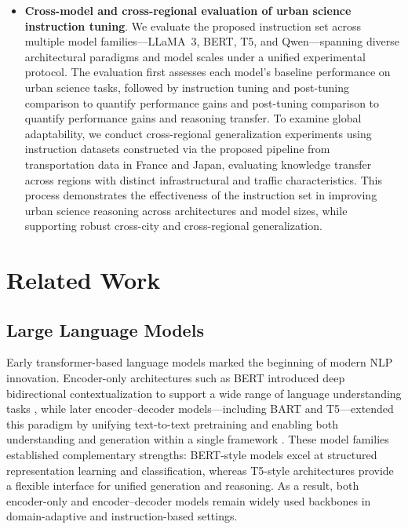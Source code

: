 \documentclass[a4paper,fleqn]{cas-sc}
\begin{document}
\begin{itemize}
    \item \textbf{Cross-model and cross-regional evaluation of urban science instruction tuning}. We evaluate the proposed instruction set across multiple model families—LLaMA~3, BERT, T5, and Qwen—spanning diverse architectural paradigms and model scales under a unified experimental protocol. The evaluation first assesses each model’s baseline performance on urban science tasks, followed by instruction tuning and post-tuning comparison to quantify performance gains and post-tuning comparison to quantify performance gains and reasoning transfer. To examine global adaptability, we conduct cross-regional generalization experiments using instruction datasets constructed via the proposed pipeline from transportation data in France and Japan, evaluating knowledge transfer across regions with distinct infrastructural and traffic characteristics. This process demonstrates the effectiveness of the instruction set in improving urban science reasoning across architectures and model sizes, while supporting robust cross-city and cross-regional generalization.

\end{itemize}

\section{Related Work}
\label{sec:related-work}

\subsection{Large Language Models}

Early transformer-based language models marked the beginning of modern NLP innovation. Encoder-only architectures such as BERT introduced deep bidirectional contextualization to support a wide range of language understanding tasks \cite{devlin2019bert}, while later encoder--decoder models---including BART and T5---extended this paradigm by unifying text-to-text pretraining and enabling both understanding and generation within a single framework \cite{lewis2020bart,raffel2020t5}. These model families established complementary strengths: BERT-style models excel at structured representation learning and classification, whereas T5-style architectures provide a flexible interface for unified generation and reasoning. As a result, both encoder-only and encoder--decoder models remain widely used backbones in domain-adaptive and instruction-based settings.
\end{document}
